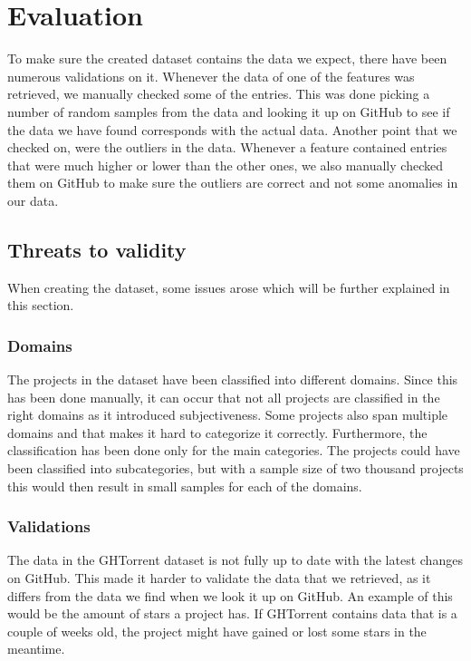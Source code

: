 \section{Evaluation}
To make sure the created dataset contains the data we expect, there have been numerous validations on it.
Whenever the data of one of the features was retrieved, we manually checked some of the entries.
This was done picking a number of random samples from the data and looking it up on GitHub to see if the data we have found corresponds with the actual data.
Another point that we checked on, were the outliers in the data.
Whenever a feature contained entries that were much higher or lower than the other ones, we also manually checked them on GitHub to make sure the outliers are correct and not some anomalies in our data.

\subsection{Threats to validity}
When creating the dataset, some issues arose which will be further explained in this section.\\

\subsubsection{Domains}
The projects in the dataset have been classified into different domains.
Since this has been done manually, it can occur that not all projects are classified in the right domains as it introduced subjectiveness.
Some projects also span multiple domains and that makes it hard to categorize it correctly.
Furthermore, the classification has been done only for the main categories.
The projects could have been classified into subcategories, but with a sample size of two thousand projects this would then result in small samples for each of the domains.\\

\subsubsection{Validations}
The data in the GHTorrent dataset is not fully up to date with the latest changes on GitHub.
This made it harder to validate the data that we retrieved, as it differs from the data we find when we look it up on GitHub.
An example of this would be the amount of stars a project has.
If GHTorrent contains data that is a couple of weeks old, the project might have gained or lost some stars in the meantime.\\

